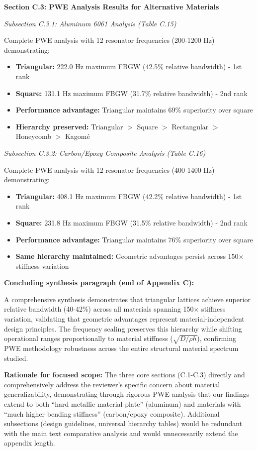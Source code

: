 \documentclass[11pt,a4paper]{article}
\newenvironment{changesbox}{%
    \par\medskip\noindent{\color{changescolor}\rule{\linewidth}{2pt}}\par
    \noindent{\color{changescolor}\bfseries Manuscript Changes}\par\smallskip
}{%
    \par\noindent{\color{changescolor}\rule{\linewidth}{0.5pt}}\medskip
}
\begin{document}
\begin{changesbox}
\textbf{Section C.3: PWE Analysis Results for Alternative Materials}

\textit{Subsection C.3.1: Aluminum 6061 Analysis (Table C.15)}

Complete PWE analysis with 12 resonator frequencies (200-1200 Hz) demonstrating:
\begin{itemize}
    \item \textbf{Triangular:} 222.0 Hz maximum FBGW (42.5\% relative bandwidth) - 1st rank
    \item \textbf{Square:} 131.1 Hz maximum FBGW (31.7\% relative bandwidth) - 2nd rank
    \item \textbf{Performance advantage:} Triangular maintains 69\% superiority over square
    \item \textbf{Hierarchy preserved:} Triangular $>$ Square $>$ Rectangular $>$ Honeycomb $>$ Kagomé
\end{itemize}

\textit{Subsection C.3.2: Carbon/Epoxy Composite Analysis (Table C.16)}

Complete PWE analysis with 12 resonator frequencies (400-1400 Hz) demonstrating:
\begin{itemize}
    \item \textbf{Triangular:} 408.1 Hz maximum FBGW (42.2\% relative bandwidth) - 1st rank
    \item \textbf{Square:} 231.8 Hz maximum FBGW (31.5\% relative bandwidth) - 2nd rank
    \item \textbf{Performance advantage:} Triangular maintains 76\% superiority over square
    \item \textbf{Same hierarchy maintained:} Geometric advantages persist across 150$\times$ stiffness variation
\end{itemize}

\textbf{Concluding synthesis paragraph (end of Appendix C):}

A comprehensive synthesis demonstrates that triangular lattices achieve superior relative bandwidth (40-42\%) across all materials spanning 150$\times$ stiffness variation, validating that geometric advantages represent material-independent design principles. The frequency scaling preserves this hierarchy while shifting operational ranges proportionally to material stiffness ($\sqrt{D/\rho h}$), confirming PWE methodology robustness across the entire structural material spectrum studied.

\textbf{Rationale for focused scope:} The three core sections (C.1-C.3) directly and comprehensively address the reviewer's specific concern about material generalizability, demonstrating through rigorous PWE analysis that our findings extend to both ``hard metallic material plate'' (aluminum) and materials with ``much higher bending stiffness'' (carbon/epoxy composite). Additional subsections (design guidelines, universal hierarchy tables) would be redundant with the main text comparative analysis and would unnecessarily extend the appendix length.


\end{changesbox}
\end{document}
